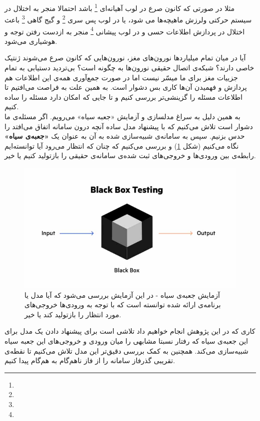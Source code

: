 مثلا در صورتی که کانون صرع در لوب آهیانه‌ای 
\footnote{
}
باشد احتمالا منجر به اختلال در سیستم حرکتی ولرزش ماهیچه‌ها می شود، یا در لوب پس سری
\footnote{
}
 و گیج گاهی
\footnote{
}
  باعث اختلال در پردازش اطلاعات حسی و در لوب پیشانی
\footnote{
}
   منجر به ازدست رفتن توجه و هوشیاری می‌شود.

آیا در میان تمام میلیاردها نورون‌های مغز، نورون‌هایی که کانون صرع می‌شوند ژنتیک خاصی دارند؟ شبکه‌ی اتصال حقیقی نورون‌ها به چگونه است؟ بی‌تردید دستیابی به تمام جزییات مغز برای ما میسّر نیست اما در صورت جمع‌آوری همه‌ی این اطلاعات هم پردازش و فهمیدن آن‌ها کاری بس دشوار است. به همین علت به فراصت می‌افتیم تا اطلاعات مسئله را گزینشی‌تر بررسی کنیم و تا جایی که امکان دارد مسئله را ساده کنیم.\\

به همین دلیل به سراغ مدلسازی و آزمایش «جعبه سیاه» می‌رویم. اگر مسئله‌ی ما دشوار است تلاش می‌کنیم که با پیشنهاد مدل ساده‌ آنچه درون سامانه اتفاق می‌افتد را حدس بزنیم. سپس به سامانه‌ی شبیه‌سازی شده به آن به عنوان یک \textbf{«جعبه‌ی سیاه»} نگاه می‌کنیم (شکل 
\ref{fig:black_box})
 و بررسی می‌کنیم که چنان که انتظار می‌رود آیا توانسته‌ایم رابطه‌ی بین ورودی‌ها و خروجی‌های ثبت شده‌ی سامانه‌ی حقیقی را بازتولید کنیم یا خیر.\\

\begin{figure}
	\centering
	\includegraphics[width=\textwidth]{../Figures/Black_box_test.jpg}
	\caption{
		آزمایش جعبه‌ی سیاه - در این آزمایش بررسی می‌شود که آیا مدل یا برنامه‌ی ارائه شده توانسته است که با توجه به ورودی‌ها خروجی‌های مورد انتظار را بازتولید کند یا خیر.}
	\label{fig:black_box}
\end{figure}

  کاری که در این پژوهش انجام خواهیم داد تلاشی است برای پیشنهاد دادن یک مدل برای این جعبه‌ی سیاه که رفتار نسبتا مشابهی را میان ورودی و خروجی‌های این جعبه سیاه شبیه‌سازی می‌کند. همچنین به کمک بررسی دقیق‌تر این مدل تلاش می‌کنیم تا نقطه‌ی تقریبی گذرفاز سامانه را از فاز ناهم‌گام به هم‌گام پیدا کنیم.

